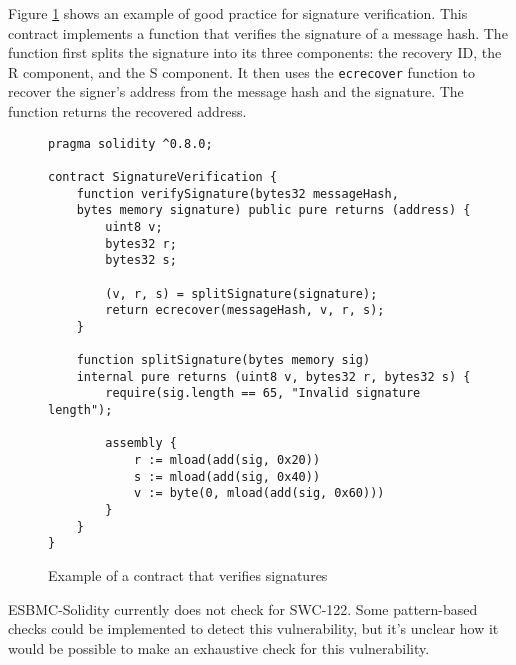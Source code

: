 Figure \ref{fig:signature_verification} shows an example of good practice for signature verification. This contract implements a function that verifies the signature of a message hash. The function first splits the signature into its three components: the recovery ID, the R component, and the S component. It then uses the \verb|ecrecover| function to recover the signer's address from the message hash and the signature. The function returns the recovered address.


\begin{figure}
\begin{lstlisting}
pragma solidity ^0.8.0;

contract SignatureVerification {
    function verifySignature(bytes32 messageHash,
    bytes memory signature) public pure returns (address) {
        uint8 v;
        bytes32 r;
        bytes32 s;
        
        (v, r, s) = splitSignature(signature);
        return ecrecover(messageHash, v, r, s);
    }

    function splitSignature(bytes memory sig)
    internal pure returns (uint8 v, bytes32 r, bytes32 s) {
        require(sig.length == 65, "Invalid signature length");

        assembly {
            r := mload(add(sig, 0x20))
            s := mload(add(sig, 0x40))
            v := byte(0, mload(add(sig, 0x60)))
        }
    }
}
\end{lstlisting}
\caption{Example of a contract that verifies signatures}
\label{fig:signature_verification}
\end{figure}

ESBMC-Solidity currently does not check for SWC-122. Some pattern-based checks could be implemented to detect this vulnerability, but it's unclear how it would be possible to make an exhaustive check for this vulnerability.


\section{}